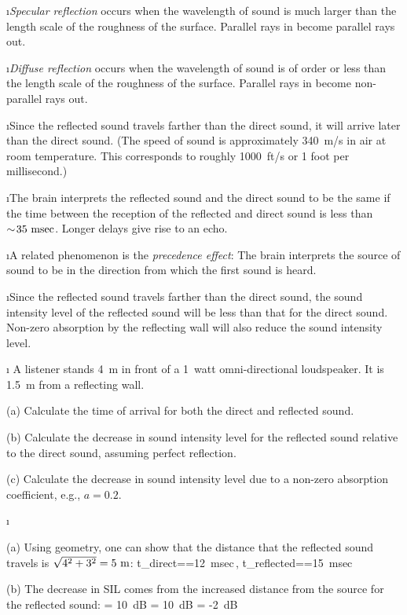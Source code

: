 \i {\em Specular reflection} occurs when the wavelength of sound 
is much larger than the length scale of the roughness of the surface.
Parallel rays in become parallel rays out.

\i {\em Diffuse reflection} occurs when the wavelength of sound
is of order or less than the length scale of the roughness of the surface.
Parallel rays in become non-parallel rays out.

\i Since the reflected sound travels farther than the 
direct sound, it will arrive later than the direct sound.
(The speed of sound is approximately 340~m/s in air at room temperature.
This corresponds to roughly 1000~ft/s or 1 foot per millisecond.)

\i The brain interprets the reflected sound and the direct sound 
to be the same if the time between the reception of the reflected 
and direct sound is less than $\sim\!35~{\rm msec}$.
Longer delays give rise to an echo.

\i A related phenomenon is the {\em precedence effect}:
The brain interprets the source of sound to be in the direction 
from which the first sound is heard.

\i Since the reflected sound travels farther
than the direct sound, the sound intensity level of the reflected
sound will be less than that for the direct sound.
Non-zero absorption by the reflecting wall will also reduce 
the sound intensity level.

\i \exer
A listener stands 4~m in front of a 1~watt omni-directional loudspeaker.
It is 1.5~m from a reflecting wall.

(a) Calculate the time of arrival for both the 
direct and reflected sound.

(b) Calculate the decrease in sound intensity level 
for the reflected sound relative to the direct sound,
assuming perfect reflection.

(c) Calculate the decrease in sound intensity level 
due to a non-zero absorption coefficient, e.g., $a = 0.2$.

\i \ans

(a) Using geometry, one can show that the distance that the 
reflected sound travels is $\sqrt{4^2+3^2}=5~{\rm m}$:
%
\be
t_{\rm direct}==12~{\rm msec}\,,
\qquad
t_{\rm reflected}==15~{\rm msec}
\ee

(b) The decrease in SIL comes from the increased distance 
from the source for the reflected sound:
%
\be
{} 
= 10~{\rm dB}
= 10\log[(4/5)^2]~{\rm dB} 
= -2~{\rm dB}
\ee

